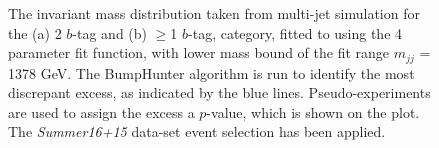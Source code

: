 \begin{figure}[!ht]
  \begin{center}
    \captionsetup[subfigure]{aboveskip=0pt,justification=centering}
  \end{center}
  \caption{ The invariant mass distribution taken from multi-jet simulation for the (a) 2 $b$-tag and (b) $\geq$1 $b$-tag,
    category, fitted to using the 4 parameter fit function, with lower mass bound of the fit range $m_{jj}$ = 1378 GeV.
    The BumpHunter algorithm is run to identify the most discrepant excess, as indicated by the blue lines.
    Pseudo-experiments are used to assign the excess a $p$-value, which is shown on the plot. 
    The \textit{Summer16+15} data-set event selection has been applied.}
  \label{fig:Short_4para_1378_figure1}
\end{figure}


